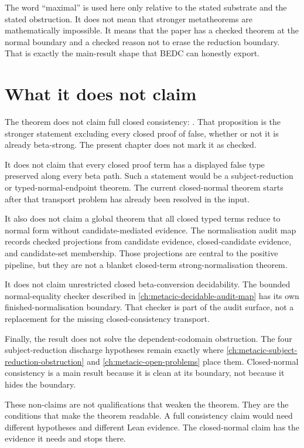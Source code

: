 The word ``maximal'' is used here only relative to the stated substrate and
the stated obstruction. It does not mean that stronger metatheorems are
mathematically impossible. It means that the paper has a checked theorem at
the normal boundary and a checked reason not to erase the reduction boundary.
That is exactly the main-result shape that BEDC can honestly export.

\section{What it does not claim}
\label{sec:closed-normal-consistency-main-result-not-claim}

The theorem does not claim full closed consistency:
. That proposition is the
stronger statement excluding every closed proof of false, whether or not it is
already beta-strong. The present chapter does not mark it as checked.

It does not claim that every closed proof term has a displayed false type
preserved along every beta path. Such a statement would be a subject-reduction
or typed-normal-endpoint theorem. The current closed-normal theorem starts
after that transport problem has already been resolved in the input.

It also does not claim a global theorem that all closed typed terms reduce to
normal form without candidate-mediated evidence. The normalisation audit map
records checked projections from candidate evidence, closed-candidate evidence,
and candidate-set membership. Those projections are central to the positive
pipeline, but they are not a blanket closed-term strong-normalisation theorem.

It does not claim unrestricted closed beta-conversion decidability. The
bounded normal-equality checker described in
\autoref{ch:metacic-decidable-audit-map} has its own finished-normalisation
boundary. That checker is part of the audit surface, not a replacement for the
missing closed-consistency transport.

Finally, the result does not solve the dependent-codomain obstruction. The
four subject-reduction discharge hypotheses remain exactly where
\autoref{ch:metacic-subject-reduction-obstruction} and
\autoref{ch:metacic-open-problems} place them. Closed-normal consistency is a
main result because it is clean at its boundary, not because it hides the
boundary.

These non-claims are not qualifications that weaken the theorem. They are the
conditions that make the theorem readable. A full consistency claim would need
different hypotheses and different Lean evidence. The closed-normal claim has
the evidence it needs and stops there.

